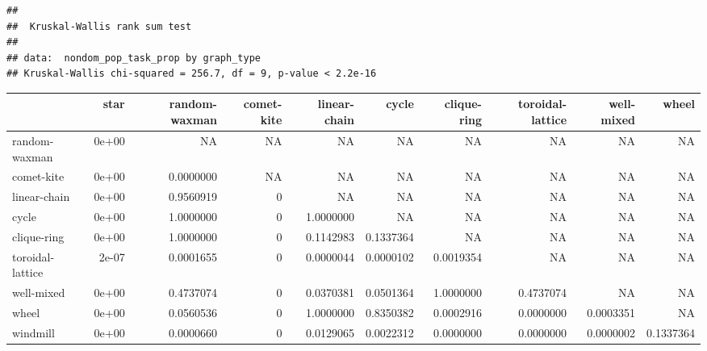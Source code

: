 \documentclass[
]{book}
\newenvironment{Shaded}{\begin{snugshade}}{\end{snugshade}}
\newcommand{\AttributeTok}[1]{\textcolor[rgb]{0.77,0.63,0.00}{#1}}
\newcommand{\ConstantTok}[1]{\textcolor[rgb]{0.00,0.00,0.00}{#1}}
\newcommand{\FunctionTok}[1]{\textcolor[rgb]{0.00,0.00,0.00}{#1}}
\newcommand{\NormalTok}[1]{#1}
\newcommand{\OtherTok}[1]{\textcolor[rgb]{0.56,0.35,0.01}{#1}}
\newcommand{\SpecialCharTok}[1]{\textcolor[rgb]{0.00,0.00,0.00}{#1}}
\newcommand{\StringTok}[1]{\textcolor[rgb]{0.31,0.60,0.02}{#1}}
\begin{document}
\begin{verbatim}
## 
##  Kruskal-Wallis rank sum test
## 
## data:  nondom_pop_task_prop by graph_type
## Kruskal-Wallis chi-squared = 256.7, df = 9, p-value < 2.2e-16
\end{verbatim}

\begin{Shaded}
\end{Shaded}

\begin{table}
\centering
\begin{tabular}[t]{l|r|r|r|r|r|r|r|r|r}
\hline
  & star & random-waxman & comet-kite & linear-chain & cycle & clique-ring & toroidal-lattice & well-mixed & wheel\\
\hline
random-waxman & 0e+00 & NA & NA & NA & NA & NA & NA & NA & NA\\
\hline
comet-kite & 0e+00 & 0.0000000 & NA & NA & NA & NA & NA & NA & NA\\
\hline
linear-chain & 0e+00 & 0.9560919 & 0 & NA & NA & NA & NA & NA & NA\\
\hline
cycle & 0e+00 & 1.0000000 & 0 & 1.0000000 & NA & NA & NA & NA & NA\\
\hline
clique-ring & 0e+00 & 1.0000000 & 0 & 0.1142983 & 0.1337364 & NA & NA & NA & NA\\
\hline
toroidal-lattice & 2e-07 & 0.0001655 & 0 & 0.0000044 & 0.0000102 & 0.0019354 & NA & NA & NA\\
\hline
well-mixed & 0e+00 & 0.4737074 & 0 & 0.0370381 & 0.0501364 & 1.0000000 & 0.4737074 & NA & NA\\
\hline
wheel & 0e+00 & 0.0560536 & 0 & 1.0000000 & 0.8350382 & 0.0002916 & 0.0000000 & 0.0003351 & NA\\
\hline
windmill & 0e+00 & 0.0000660 & 0 & 0.0129065 & 0.0022312 & 0.0000000 & 0.0000000 & 0.0000002 & 0.1337364\\
\hline
\end{tabular}
\end{table}
\end{document}
